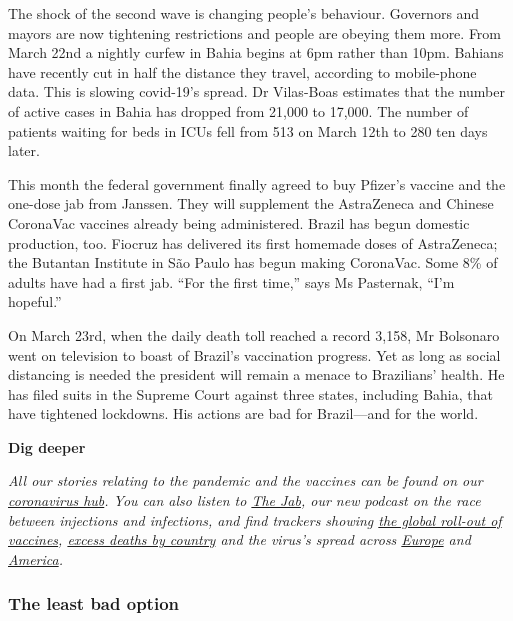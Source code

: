 \documentclass{article}
\begin{document}
The shock of the second wave is changing people's behaviour. Governors and mayors are now tightening restrictions and people are obeying them more. From March 22nd a nightly curfew in Bahia begins at 6pm rather than 10pm. Bahians have recently cut in half the distance they travel, according to mobile-phone data. This is slowing covid-19's spread. Dr Vilas-Boas estimates that the number of active cases in Bahia has dropped from 21,000 to 17,000. The number of patients waiting for beds in ICUs fell from 513 on March 12th to 280 ten days later. 

This month the federal government finally agreed to buy Pfizer's vaccine and the one-dose jab from Janssen. They will supplement the AstraZeneca and Chinese CoronaVac vaccines already being administered. Brazil has begun domestic production, too. Fiocruz has delivered its first homemade doses of AstraZeneca; the Butantan Institute in São Paulo has begun making CoronaVac. Some 8\% of adults have had a first jab. ``For the first time,'' says Ms Pasternak, ``I'm hopeful.'' 

On March 23rd, when the daily death toll reached a record 3,158, Mr Bolsonaro went on television to boast of Brazil's vaccination progress. Yet as long as social distancing is needed the president will remain a menace to Brazilians' health. He has filed suits in the Supreme Court against three states, including Bahia, that have tightened lockdowns. His actions are bad for Brazil---and for the world.{} 

\textbf{Dig deeper} 

\emph{All our stories relating to the pandemic and the vaccines can be found on our \href{/news/2020/03/11/the-economists-coverage-of-the-coronavirus}{coronavirus hub}. You can also listen to \href{/podcasts/the-jab-a-new-podcast-from-the-economist}{The Jab}, our new podcast on the race between injections and infections, and find trackers showing \href{https://www.economist.com/graphic-detail/tracking-coronavirus-across-the-world}{the global roll-out of vaccines}, \href{https://www.economist.com/graphic-detail/coronavirus-excess-deaths-tracker}{excess deaths by country} and the virus's spread across \href{https://www.economist.com/graphic-detail/tracking-coronavirus-across-europe}{Europe} and \href{https://www.economist.com/graphic-detail/tracking-coronavirus-across-america}{America}.} 
\clearpage
\subsubsection{The least bad option }
\end{document}
